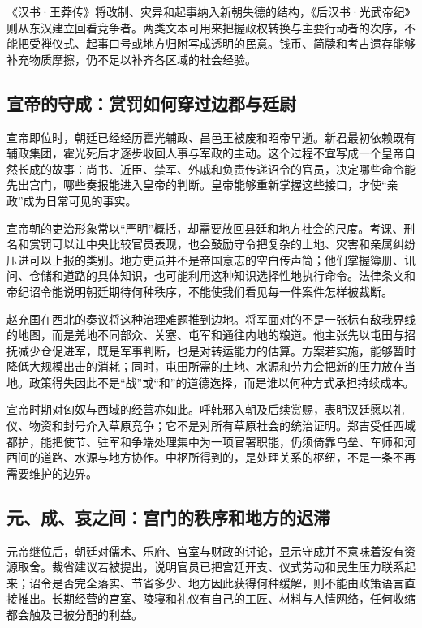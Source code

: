\begin{sourcenote}[从西汉到新朝的叙事位置]
《汉书·王莽传》将改制、灾异和起事纳入新朝失德的结构，《后汉书·光武帝纪》则从东汉建立回看竞争者。两类文本可用来把握政权转换与主要行动者的次序，不能把受禅仪式、起事口号或地方归附写成透明的民意。钱币、简牍和考古遗存能够补充物质摩擦，仍不足以补齐各区域的社会经验。
\end{sourcenote}

\subsection{宣帝的守成：赏罚如何穿过边郡与廷尉}

宣帝即位时，朝廷已经经历霍光辅政、昌邑王被废和昭帝早逝。新君最初依赖既有辅政集团，霍光死后才逐步收回人事与军政的主动。这个过程不宜写成一个皇帝自然长成的故事：尚书、近臣、禁军、外戚和负责传递诏令的官员，决定哪些命令能先出宫门，哪些奏报能进入皇帝的判断。皇帝能够重新掌握这些接口，才使“亲政”成为日常可见的事实。

宣帝朝的吏治形象常以“严明”概括，却需要放回县廷和地方社会的尺度。考课、刑名和赏罚可以让中央比较官员表现，也会鼓励守令把复杂的土地、灾害和亲属纠纷压进可以上报的类别。地方吏员并不是帝国意志的空白传声筒；他们掌握簿册、讯问、仓储和道路的具体知识，也可能利用这种知识选择性地执行命令。法律条文和帝纪诏令能说明朝廷期待何种秩序，不能使我们看见每一件案件怎样被裁断。

赵充国在西北的奏议将这种治理难题推到边地。将军面对的不是一张标有敌我界线的地图，而是羌地不同部众、关塞、屯军和通往内地的粮道。他主张先以屯田与招抚减少仓促进军，既是军事判断，也是对转运能力的估算。方案若实施，能够暂时降低大规模出击的消耗；同时，屯田所需的土地、水源和劳力会把新的压力放在当地。政策得失因此不是“战”或“和”的道德选择，而是谁以何种方式承担持续成本。

宣帝时期对匈奴与西域的经营亦如此。呼韩邪入朝及后续赏赐，表明汉廷愿以礼仪、物资和封号介入草原竞争；它不是对所有草原社会的统治证明。郑吉受任西域都护，能把使节、驻军和争端处理集中为一项官署职能，仍须倚靠乌垒、车师和河西间的道路、水源与地方协作。中枢所得到的，是处理关系的枢纽，不是一条不再需要维护的边界。

\subsection{元、成、哀之间：宫门的秩序和地方的迟滞}

元帝继位后，朝廷对儒术、乐府、宫室与财政的讨论，显示守成并不意味着没有资源取舍。裁省建议若被提出，说明官员已把宫廷开支、仪式劳动和民生压力联系起来；诏令是否完全落实、节省多少、地方因此获得何种缓解，则不能由政策语言直接推出。长期经营的宫室、陵寝和礼仪有自己的工匠、材料与人情网络，任何收缩都会触及已被分配的利益。

